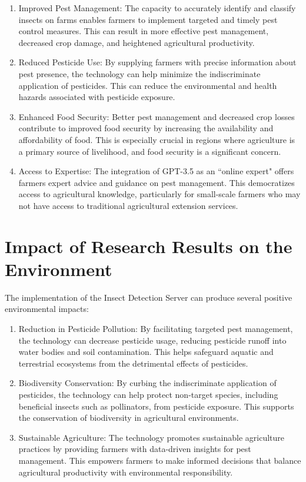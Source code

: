 \begin{enumerate}
    \item Improved Pest Management: The capacity to accurately identify and classify insects on farms enables farmers to implement targeted and timely pest control measures. This can result in more effective pest management, decreased crop damage, and heightened agricultural productivity.

    \item Reduced Pesticide Use: By supplying farmers with precise information about pest presence, the technology can help minimize the indiscriminate application of pesticides. This can reduce the environmental and health hazards associated with pesticide exposure.

    \item Enhanced Food Security: Better pest management and decreased crop losses contribute to improved food security by increasing the availability and affordability of food. This is especially crucial in regions where agriculture is a primary source of livelihood, and food security is a significant concern.

    \item Access to Expertise: The integration of GPT-3.5 as an ``online expert" offers farmers expert advice and guidance on pest management. This democratizes access to agricultural knowledge, particularly for small-scale farmers who may not have access to traditional agricultural extension services.
\end{enumerate}

\section{Impact of Research Results on the Environment}
The implementation of the Insect Detection Server can produce several positive environmental impacts:

\begin{enumerate}
    \item Reduction in Pesticide Pollution: By facilitating targeted pest management, the technology can decrease pesticide usage, reducing pesticide runoff into water bodies and soil contamination. This helps safeguard aquatic and terrestrial ecosystems from the detrimental effects of pesticides.

    \item Biodiversity Conservation: By curbing the indiscriminate application of pesticides, the technology can help protect non-target species, including beneficial insects such as pollinators, from pesticide exposure. This supports the conservation of biodiversity in agricultural environments.

    \item Sustainable Agriculture: The technology promotes sustainable agriculture practices by providing farmers with data-driven insights for pest management. This empowers farmers to make informed decisions that balance agricultural productivity with environmental responsibility.
\end{enumerate}

